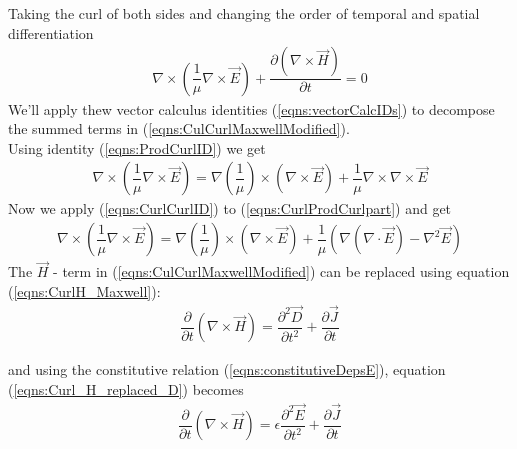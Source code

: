 \documentclass[12pt,twoside]{report}
\begin{document}
\begin{appendices}
Taking the curl of both sides and changing the order of temporal and spatial differentiation
\begin{align}
\label{eqns:CulCurlMaxwellModified}
\nabla \times \left( \dfrac{1}{\mu} \nabla \times \overrightarrow{E} \right)  + \dfrac{\partial (\nabla \times  \overrightarrow{H})}{\partial t} = 0
\end{align}
We'll apply thew vector calculus identities (\ref{eqns:vectorCalcIDs}) to decompose the summed terms in (\ref{eqns:CulCurlMaxwellModified}).\\
Using identity (\ref{eqns:ProdCurlID}) we get
\begin{align}
\label{eqns:CurlProdCurlpart}
\nabla \times \left( \dfrac{1}{\mu} \nabla \times \overrightarrow{E} \right) = \nabla \left( \dfrac{1}{\mu} \right) \times \left(\nabla \times \overrightarrow{E} \right) + \dfrac{1}{\mu} \nabla \times \nabla \times \overrightarrow{E}
\end{align}
Now we apply (\ref{eqns:CurlCurlID}) to (\ref{eqns:CurlProdCurlpart}) and get
\begin{align}
\label{eqns:CurlProdCurlExpanded}
\nabla \times \left( \dfrac{1}{\mu} \nabla \times \overrightarrow{E} \right) = \nabla \left( \dfrac{1}{\mu} \right) \times \left(\nabla \times \overrightarrow{E} \right) + \dfrac{1}{\mu} \left( \nabla (\nabla \cdot \overrightarrow{E}) - \nabla^2 \overrightarrow{E}\right)
\end{align}
The $\overrightarrow{H}$ - term in (\ref{eqns:CulCurlMaxwellModified}) can be replaced using equation (\ref{eqns:CurlH_Maxwell}):
\begin{align}
\label{eqns:Curl_H_replaced_D}
\dfrac{\partial}{\partial t} \left( \nabla \times \overrightarrow{H}\right) = \dfrac{\partial^2 \overrightarrow{D}}{\partial t^2} + \dfrac{\partial \overrightarrow{J}}{\partial t}
\end{align}

and using the constitutive relation (\ref{eqns:constitutiveDepsE}), equation (\ref{eqns:Curl_H_replaced_D}) becomes
\begin{align}
\label{eqns:Curl_H_replaced_E}
\dfrac{\partial}{\partial t} \left( \nabla \times \overrightarrow{H}\right) = \epsilon\dfrac{\partial^2 \overrightarrow{E}}{\partial t^2} + \dfrac{\partial \overrightarrow{J}}{\partial t}
\end{align}


\end{appendices}
\end{document}
